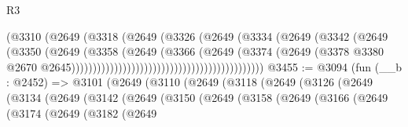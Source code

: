 \begin{lexlean}{R3}
\begin{coremodule}
                                                        (@3310
                                                          (@2649
                                                            (@3318
                                                              (@2649
                                                                (@3326
                                                                  (@2649
                                                                    (@3334
                                                                      (@2649
                                                                        (@3342
                                                                          (@2649
                                                                            (@3350
                                                                              (@2649
                                                                                (@3358
                                                                                  (@2649
                                                                                    (@3366
                                                                                      (@2649
                                                                                        (@3374
                                                                                          (@2649
                                                                                            (@3378
                                                                                              @3380
                                                                                              @2670
                                                                                              @2645)))))))))))))))))))))))))))))))))))))))))))))
@3455 := @3094
    (fun (__b : @2452) =>
    @3101
      (@2649
        (@3110
          (@2649
            (@3118
              (@2649
                (@3126
                  (@2649
                    (@3134
                      (@2649
                        (@3142
                          (@2649
                            (@3150
                              (@2649
                                (@3158
                                  (@2649
                                    (@3166
                                      (@2649
                                        (@3174
                                          (@2649
                                            (@3182
                                              (@2649

\end{coremodule}
\end{lexlean}
